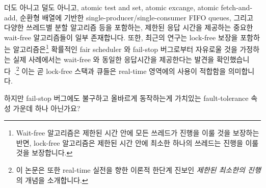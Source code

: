 더도 아니고 덜도 아니고, atomic test and set, atomic excange, atomic
fetch-and-add, 순환형 배열에 기반한 single-producer/single-consumer FIFO
queues, 그리고 다양한 쓰레드별 분할 알고리즘 등을 포함하는, 제한된 응답 시간을
제공하는 중요한 wait-free 알고리즘들이 일부 존재합니다.
또한, 최근의 연구는 lock-free 보장을 포함하는 알고리즘은\footnote{
	Wait-free 알고리즘은 제한된 시간 안에 모든 쓰레드가 진행을 이룰 것을
	보장하는 반면, lock-free 알고리즘은 제한된 시간 안에 최소한 하나의
	쓰레드는 진행을 이룰 것을 보장합니다.}
확률적인 fair scheduler 와 fail-stop 버그로부터 자유로울 것을 가정하는 실제
사례에서는 wait-free 와 동일한 응답시간을 제공한다는 발견을
확인했습니다~\cite{DanAlitarh2013PracticalProgress}.\footnote{
	이 논문은 또한 real-time 실전을 향한 이론적 한단계 진보인 \emph{제한된
	최소한의 진행} 의 개념을 소개합니다.}
이는 곧 lock-free 스택과 큐들은 real-time 영역에의 사용이 적합함을 의미합니다.

\QuickQuiz{}
	하지만 fail-stop 버그에도 불구하고 올바르게 동작하는게 가치있는
	fault-tolerance 속성 가운데 하나 아닌가요?
	\iffalse

